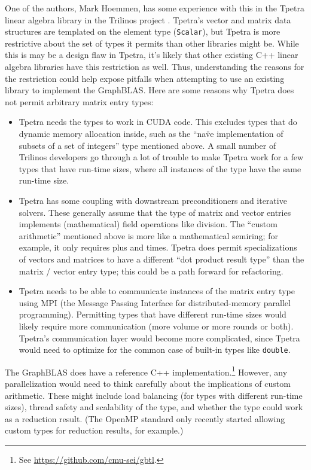 One of the authors, Mark Hoemmen, has some experience with this in the
Tpetra linear algebra library \cite{baker2012tpetra} in the Trilinos
project \cite{heroux2005trilinos}.  Tpetra's vector and matrix data
structures are templated on the element type (\texttt{Scalar}), but
Tpetra is more restrictive about the set of types it permits than
other libraries might be.  While this is may be a design flaw in
Tpetra, it's likely that other existing C++ linear algebra libraries
have this restriction as well.  Thus, understanding the reasons for
the restriction could help expose pitfalls when attempting to use an
existing library to implement the GraphBLAS.  Here are some reasons
why Tpetra does not permit arbitrary matrix entry types:
\begin{itemize}
\item Tpetra needs the types to work in CUDA code.  This excludes
  types that do dynamic memory allocation inside, such as the ``na\"ve
  implementation of subsets of a set of integers'' type mentioned
  above.  A small number of Trilinos developers go through a lot of
  trouble to make Tpetra work for a few types that have run-time
  sizes, where all instances of the type have the same run-time size.
\item Tpetra has some coupling with downstream preconditioners and
  iterative solvers.  These generally assume that the type of matrix
  and vector entries implements (mathematical) field operations like
  division.  The ``custom arithmetic'' mentioned above is more like a
  mathematical semiring; for example, it only requires plus and times.
  Tpetra does permit specializations of vectors and matrices to have a
  different ``dot product result type'' than the matrix / vector entry
  type; this could be a path forward for refactoring.
\item Tpetra needs to be able to communicate instances of the matrix
  entry type using MPI (the Message Passing Interface for
  distributed-memory parallel programming).  Permitting types that
  have different run-time sizes would likely require more
  communication (more volume or more rounds or both).  Tpetra's
  communication layer would become more complicated, since Tpetra
  would need to optimize for the common case of built-in types like
  \texttt{double}.
\end{itemize}

The GraphBLAS does have a reference C++ implementation.\footnote{See
  \url{https://github.com/cmu-sei/gbtl}.}  However, any
parallelization would need to think carefully about the implications
of custom arithmetic.  These might include load balancing (for types
with different run-time sizes), thread safety and scalability of the
type, and whether the type could work as a reduction result.  (The
OpenMP standard only recently started allowing custom types for
reduction results, for example.)

